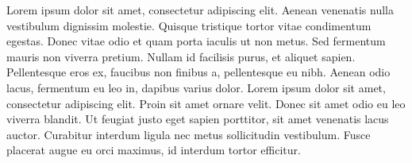 
Lorem ipsum dolor sit amet, consectetur adipiscing elit. Aenean venenatis nulla vestibulum dignissim molestie. Quisque tristique tortor vitae condimentum egestas. Donec vitae odio et quam porta iaculis ut non metus. Sed fermentum mauris non viverra pretium. Nullam id facilisis purus, et aliquet sapien. Pellentesque eros ex, faucibus non finibus a, pellentesque eu nibh. Aenean odio lacus, fermentum eu leo in, dapibus varius dolor. Lorem ipsum dolor sit amet, consectetur adipiscing elit. Proin sit amet ornare velit. Donec sit amet odio eu leo viverra blandit. Ut feugiat justo eget sapien porttitor, sit amet venenatis lacus auctor. Curabitur interdum ligula nec metus sollicitudin vestibulum. Fusce placerat augue eu orci maximus, id interdum tortor efficitur.
